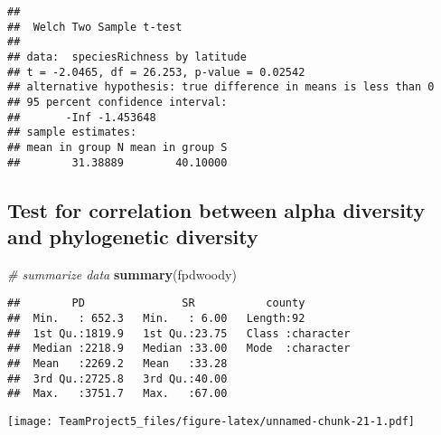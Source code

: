 \documentclass[
]{article}
\newenvironment{Shaded}{\begin{snugshade}}{\end{snugshade}}
\newcommand{\CommentTok}[1]{\textcolor[rgb]{0.56,0.35,0.01}{\textit{#1}}}
\newcommand{\KeywordTok}[1]{\textcolor[rgb]{0.13,0.29,0.53}{\textbf{#1}}}
\newcommand{\NormalTok}[1]{#1}
\newcommand{\OperatorTok}[1]{\textcolor[rgb]{0.81,0.36,0.00}{\textbf{#1}}}
\begin{document}
\begin{verbatim}
## 
##  Welch Two Sample t-test
## 
## data:  speciesRichness by latitude
## t = -2.0465, df = 26.253, p-value = 0.02542
## alternative hypothesis: true difference in means is less than 0
## 95 percent confidence interval:
##       -Inf -1.453648
## sample estimates:
## mean in group N mean in group S 
##        31.38889        40.10000
\end{verbatim}

\hypertarget{test-for-correlation-between-alpha-diversity-and-phylogenetic-diversity}{%
\subsection{Test for correlation between alpha diversity and
phylogenetic
diversity}\label{test-for-correlation-between-alpha-diversity-and-phylogenetic-diversity}}

\begin{Shaded}
\begin{Highlighting}[]
\CommentTok{# summarize data}
\KeywordTok{summary}\NormalTok{(fpdwoody)}
\end{Highlighting}
\end{Shaded}

\begin{verbatim}
##        PD               SR           county         
##  Min.   : 652.3   Min.   : 6.00   Length:92         
##  1st Qu.:1819.9   1st Qu.:23.75   Class :character  
##  Median :2218.9   Median :33.00   Mode  :character  
##  Mean   :2269.2   Mean   :33.28                     
##  3rd Qu.:2725.8   3rd Qu.:40.00                     
##  Max.   :3751.7   Max.   :67.00
\end{verbatim}

\begin{Shaded}
\end{Shaded}

\texttt{[image: TeamProject5\_files/figure-latex/unnamed-chunk-21-1.pdf]}

\begin{Shaded}
\end{Shaded}
\end{document}
